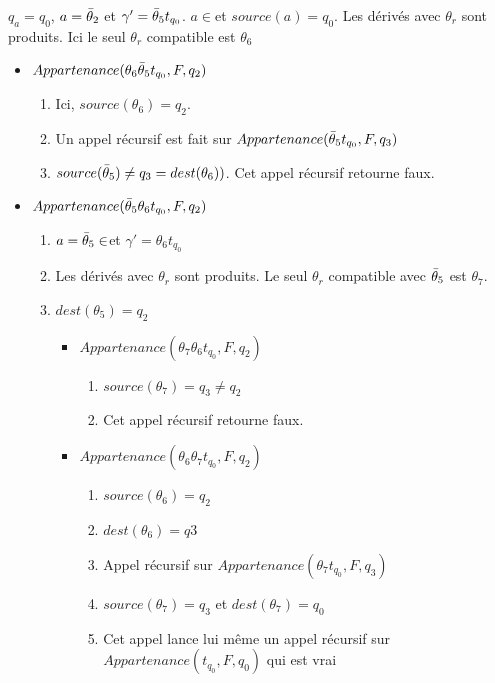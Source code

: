   $q_a=q_0$, $a=\bar{\theta}_2$ et $\gamma'=\bar{\theta}_5 t_{q_0}$. $a\in$\barTheta et $source(a)=q_0$. Les dérivés avec $\theta_r$ sont produits. Ici le seul $\theta_r$ compatible est $\theta_6$
  \begin{itemize}
    \item $Appartenance(\theta_6\bar{\theta}_5 t_{q_0}, F, q_2)$
    \begin{enumerate}
      \item Ici, $source(\theta_6)=q_2$.
      \item Un appel récursif est fait sur $Appartenance(\bar{\theta}_5 t_{q_0}, F, q_3)$
      \item $source(\bar{\theta}_5)\neq q_3=dest(\theta_6))$. Cet appel récursif retourne faux.
    \end{enumerate}
    \item $Appartenance(\bar{\theta}_5\theta_6 t_{q_0}, F, q_2)$
    \begin{enumerate}
      \item $a=\bar{\theta}_5\in$\barTheta et $\gamma'=\theta_6 t_{q_0}$
      \item Les dérivés avec $\theta_r$ sont produits. Le seul $\theta_r$ compatible avec $\bar{\theta}_5$ est $\theta_7$.
      \item $dest(\theta_5)=q_2$
      \begin{itemize}
        \item $Appartenance(\theta_7\theta_6 t_{q_0}, F, q_2)$
        \begin{enumerate}
          \item $source(\theta_7)=q_3\neq q_2$
          \item Cet appel récursif retourne faux.
        \end{enumerate}
        \item $Appartenance(\theta_6\theta_7 t_{q_0}, F, q_2)$
        \begin{enumerate}
          \item $source(\theta_6)=q_2$
          \item $dest(\theta_6)=q3$
          \item Appel récursif sur $Appartenance(\theta_7 t_{q_0}, F, q_3)$
          \item $source(\theta_7)=q_3$ et $dest(\theta_7)=q_0$
          \item Cet appel lance lui même un appel récursif sur $Appartenance(t_{q_0}, F, q_0)$ qui est vrai
        \end{enumerate}
      \end{itemize}
    \end{enumerate}
  \end{itemize}
